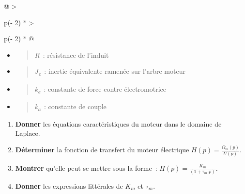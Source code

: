 \begin{longtable}[]{@{}
  >{\raggedright\arraybackslash}p{(\columnwidth - 2\tabcolsep) * }
  >{\raggedright\arraybackslash}p{(\columnwidth - 2\tabcolsep) * }@{}}
\begin{minipage}[b]{\linewidth}
\begin{itemize}
\item
  \begin{quote}
  \emph{R}~: résistance de l'induit
  \end{quote}
\item
  \begin{quote}
  \emph{J\textsubscript{e}}~: inertie équivalente ramenée sur l'arbre moteur
  \end{quote}
\item
  \begin{quote}
  \emph{k\textsubscript{e}}~: constante de force contre électromotrice
  \end{quote}
\item
  \begin{quote}
  \emph{k\textsubscript{a}}~: constante de couple
  \end{quote}
\end{itemize}

\begin{enumerate}
\def\labelenumi{\arabic{enumi}.}
\item
  \textbf{Donner} les équations caractéristiques du moteur dans le domaine de Laplace.
\item
  \textbf{Déterminer} la fonction de transfert du moteur électrique \(H(p) = \frac{\Omega_{m}(p)}{U(p)}\).
\item
  \textbf{Montrer} qu'elle peut se mettre sous la forme~: \(H(p) = \frac{K_{m}}{(1 + \tau_{m}.p)}\).
\item
  \textbf{Donner} les expressions littérales de \(K_{m}\) et \(\tau_{m}\).
\end{enumerate}
\end{minipage} \\
\midrule\noalign{}
\endhead
\bottomrule\noalign{}
\endlastfoot
\end{longtable}

